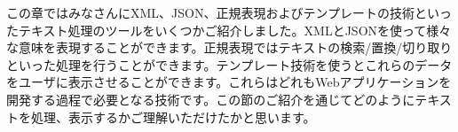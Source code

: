 この章ではみなさんにXML、JSON、正規表現およびテンプレートの技術といったテキスト処理のツールをいくつかご紹介しました。XMLとJSONを使って様々な意味を表現することができます。正規表現ではテキストの検索/置換/切り取りといった処理を行うことができます。テンプレート技術を使うとこれらのデータをユーザに表示させることができます。これらはどれもWebアプリケーションを開発する過程で必要となる技術です。この節のご紹介を通じてどのようにテキストを処理、表示するかご理解いただけたかと思います。
